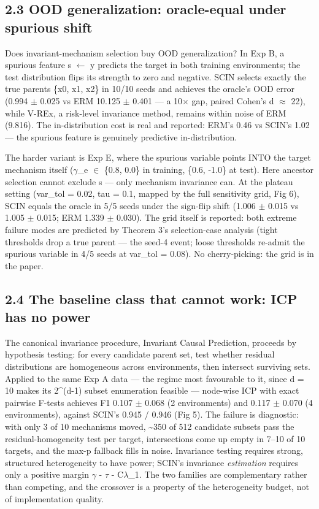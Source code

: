 \documentclass[11pt]{article}
\begin{document}
\subsection{2.3 OOD generalization: oracle-equal under spurious shift}\label{results-2.3-ood-generalization-oracle-equal-under-spurious-shift-exp-b-exp-e}

Does invariant-mechanism selection buy OOD generalization? In Exp B,
a spurious feature s \(\leftarrow\) y predicts the target in both training
environments; the test distribution flips its strength to zero and
negative. SCIN selects exactly the true parents \{x0, x1, x2\} in 10/10
seeds and achieves the oracle's OOD error (0.994 \(\pm\) 0.025 vs ERM
10.125 \(\pm\) 0.401 --- a 10\(\times\) gap, paired Cohen's d \(\approx\) 22), while V-REx, a
risk-level invariance method, remains within noise of ERM (9.816).
The in-distribution cost is real and reported: ERM's 0.46 vs SCIN's
1.02 --- the spurious feature is genuinely predictive in-distribution.

The harder variant is Exp E, where the spurious variable points INTO
the target mechanism itself (\(\gamma\)\_e \(\in\) \{0.8, 0.0\} in training, \{0.6, -1.0\}
at test). Here ancestor selection cannot exclude s --- only mechanism
invariance can. At the plateau setting (var\_tol = 0.02, tau = 0.1,
mapped by the full sensitivity grid, Fig 6), SCIN equals the oracle in
5/5 seeds under the sign-flip shift (1.006 \(\pm\) 0.015 vs 1.005 \(\pm\) 0.015;
ERM 1.339 \(\pm\) 0.030). The grid itself is reported: both extreme failure
modes are predicted by Theorem 3's selection-case analysis
(tight thresholds drop a true parent --- the seed-4 event; loose
thresholds re-admit the spurious variable in 4/5 seeds at
var\_tol = 0.08). No cherry-picking: the grid is in the paper.

\subsection{2.4 The baseline class that cannot work: ICP has no power}\label{results-2.4-the-baseline-class-that-cannot-work-icp-has-no-power-exp-f}

The canonical invariance procedure, Invariant Causal Prediction,
proceeds by hypothesis testing: for every candidate parent set, test
whether residual distributions are homogeneous across environments,
then intersect surviving sets. Applied to the same Exp A data --- the
regime most favourable to it, since d = 10 makes its 2\^{}(d-1) subset
enumeration feasible --- node-wise ICP with exact pairwise F-tests
achieves F1 0.107 \(\pm\) 0.068 (2 environments) and 0.117 \(\pm\) 0.070
(4 environments), against SCIN's 0.945 / 0.946 (Fig 5). The failure is
diagnostic: with only 3 of 10 mechanisms moved, \textasciitilde350 of 512 candidate
subsets pass the residual-homogeneity test per target, intersections
come up empty in 7--10 of 10 targets, and the max-p fallback fills in
noise. Invariance testing requires strong, structured heterogeneity to
have power; SCIN's invariance \emph{estimation} requires only a positive
margin \(\gamma\) - \(\tau\) - C\(\lambda\)\_1. The two families are complementary rather than
competing, and the crossover is a property of the heterogeneity
budget, not of implementation quality.
\end{document}

